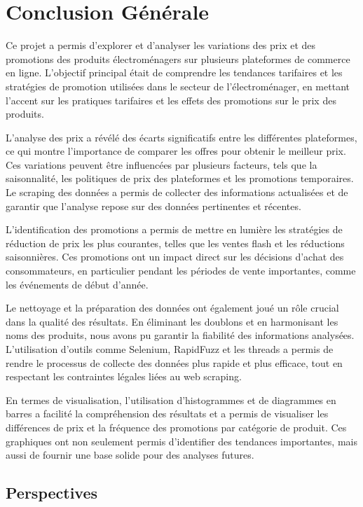 \documentclass[a4paper, 12pt, oneside]{report}
\begin{document}
\chapter{Conclusion Générale}
Ce projet a permis d’explorer et d'analyser les variations des prix et des promotions des produits électroménagers sur plusieurs plateformes de commerce en ligne. L'objectif principal était de comprendre les tendances tarifaires et les stratégies de promotion utilisées dans le secteur de l’électroménager, en mettant l'accent sur les pratiques tarifaires et les effets des promotions sur le prix des produits.

L'analyse des prix a révélé des écarts significatifs entre les différentes plateformes, ce qui montre l'importance de comparer les offres pour obtenir le meilleur prix. Ces variations peuvent être influencées par plusieurs facteurs, tels que la saisonnalité, les politiques de prix des plateformes et les promotions temporaires. Le scraping des données a permis de collecter des informations actualisées et de garantir que l’analyse repose sur des données pertinentes et récentes.

L’identification des promotions a permis de mettre en lumière les stratégies de réduction de prix les plus courantes, telles que les ventes flash et les réductions saisonnières. Ces promotions ont un impact direct sur les décisions d’achat des consommateurs, en particulier pendant les périodes de vente importantes, comme les événements de début d'année.

Le nettoyage et la préparation des données ont également joué un rôle crucial dans la qualité des résultats. En éliminant les doublons et en harmonisant les noms des produits, nous avons pu garantir la fiabilité des informations analysées. L'utilisation d'outils comme Selenium, RapidFuzz et les threads a permis de rendre le processus de collecte des données plus rapide et plus efficace, tout en respectant les contraintes légales liées au web scraping.

En termes de visualisation, l’utilisation d’histogrammes et de diagrammes en barres a facilité la compréhension des résultats et a permis de visualiser les différences de prix et la fréquence des promotions par catégorie de produit. Ces graphiques ont non seulement permis d'identifier des tendances importantes, mais aussi de fournir une base solide pour des analyses futures.

\newpage

\section*{Perspectives}
\end{document}
